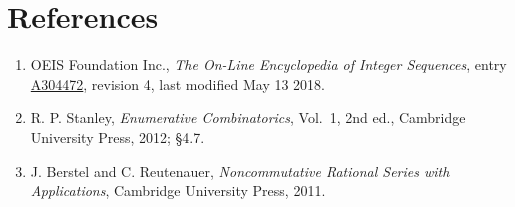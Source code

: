 \documentclass[11pt]{article}
\theoremstyle{definition}
\begin{document}
\section{References}

\begin{enumerate}

\item OEIS Foundation Inc., \emph{The On-Line Encyclopedia of Integer Sequences}, entry \href{https://oeis.org/A304472}{A304472}, revision 4, last modified May 13 2018.

\item R. P. Stanley, \emph{Enumerative Combinatorics}, Vol.~1, 2nd ed., Cambridge University Press, 2012; \S4.7.

\item J. Berstel and C. Reutenauer, \emph{Noncommutative Rational Series with Applications}, Cambridge University Press, 2011.

\end{enumerate}
\end{document}

